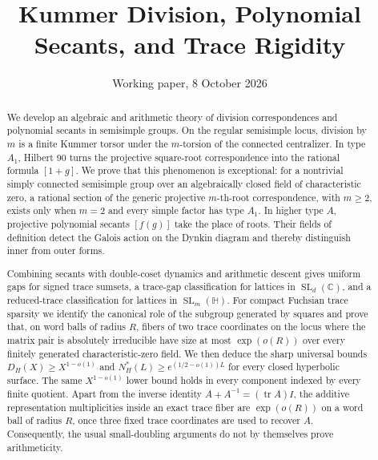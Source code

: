 \documentclass[11pt,reqno]{amsart}
\title[Kummer division and trace rigidity]{Kummer Division, Polynomial Secants, and Trace Rigidity}
\author{}
\date{Working paper, 8 October 2026}
\theoremstyle{definition}
\theoremstyle{remark}
\newcommand{\C}{\mathbb C}
\newcommand{\Tr}{\operatorname{tr}}
\newcommand{\SL}{\operatorname{SL}}
\begin{document}
\begin{abstract}
We develop an algebraic and arithmetic theory of division correspondences and
polynomial secants in semisimple groups.  On the regular semisimple locus,
division by \(m\) is a finite Kummer torsor under the \(m\)-torsion of the
connected centralizer.  In type \(A_1\), Hilbert 90 turns the projective
square-root correspondence into the rational formula \([1+g]\).  We prove
that this phenomenon is exceptional: for a nontrivial simply connected
semisimple group over an algebraically closed field of characteristic zero,
a rational section of the generic projective \(m\)-th-root correspondence,
with \(m\ge2\), exists only when \(m=2\) and every simple factor has type
\(A_1\).  In higher type \(A\),
projective polynomial secants \([f(g)]\) take the place of roots.  Their
fields of definition detect the Galois action on the Dynkin diagram and
thereby distinguish inner from outer forms.

Combining secants with double-coset dynamics and arithmetic descent gives
uniform gaps for signed trace sumsets, a trace-gap classification for lattices
in \(\SL_d(\C)\), and a reduced-trace classification for lattices in
\(\SL_m(\mathbb H)\).  For compact Fuchsian trace sparsity we identify the
canonical role of the subgroup generated by squares and prove that, on word
balls of radius \(R\), fibers of two trace coordinates on the locus where
the matrix pair is absolutely irreducible have size at most
\(\exp(o(R))\) over every finitely generated characteristic-zero field.  We
then deduce the sharp universal bounds
\(D_H(X)\ge X^{1-o(1)}\) and
\(N_H^*(L)\ge e^{(1/2-o(1))L}\) for every closed hyperbolic surface.
The same \(X^{1-o(1)}\) lower bound holds in every component indexed by
every finite quotient.  Apart from the inverse identity
\(A+A^{-1}=(\Tr A)I\), the additive representation multiplicities inside
an exact trace fiber are \(\exp(o(R))\) on a word ball of radius \(R\), once
three fixed trace coordinates are used to recover \(A\).  Consequently, the
usual small-doubling arguments do not by themselves prove arithmeticity.


\end{abstract}
\end{document}
